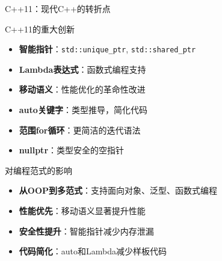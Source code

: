 \documentclass[UTF8,aspectratio=169]{beamer}
\begin{document}
\begin{frame}{C++11：现代C++的转折点}
    \begin{ytublock}{C++11的重大创新}
        \begin{itemize}
            \item \textbf{智能指针}：\texttt{std::unique\_ptr}, \texttt{std::shared\_ptr}
            \item \textbf{Lambda表达式}：函数式编程支持
            \item \textbf{移动语义}：性能优化的革命性改进
            \item \textbf{auto关键字}：类型推导，简化代码
            \item \textbf{范围for循环}：更简洁的迭代语法
            \item \textbf{nullptr}：类型安全的空指针
        \end{itemize}
    \end{ytublock}

    \begin{ytublock}{对编程范式的影响}
        \begin{itemize}
            \item \textbf{从OOP到多范式}：支持面向对象、泛型、函数式编程
            \item \textbf{性能优先}：移动语义显著提升性能
            \item \textbf{安全性提升}：智能指针减少内存泄漏
            \item \textbf{代码简化}：auto和Lambda减少样板代码
        \end{itemize}
    \end{ytublock}
\end{frame}
\end{document}
